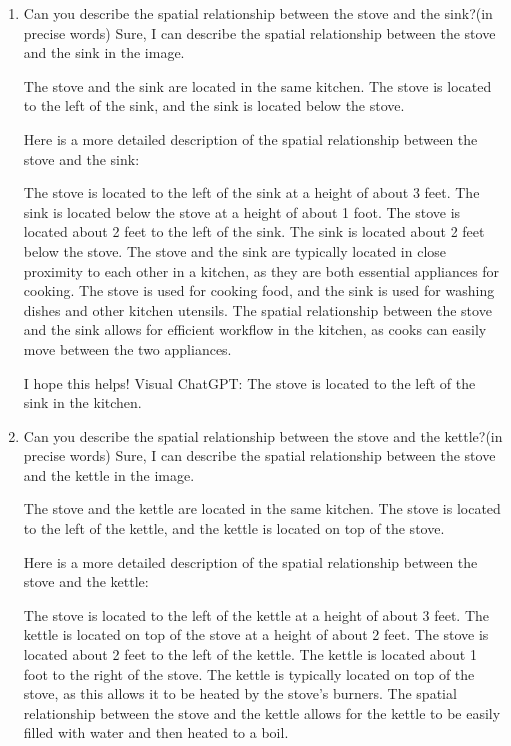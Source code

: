\begin{enumerate}
    \item Can you describe the spatial relationship between the stove and the sink?(in precise words)
    \subitem 
    Sure, I can describe the spatial relationship between the stove and the sink in the image.
    
    The stove and the sink are located in the same kitchen. The stove is located to the left of the sink, and the sink is located below the stove.
    
    Here is a more detailed description of the spatial relationship between the stove and the sink:
    
    The stove is located to the left of the sink at a height of about 3 feet.
    The sink is located below the stove at a height of about 1 foot.
    The stove is located about 2 feet to the left of the sink.
    The sink is located about 2 feet below the stove.
    The stove and the sink are typically located in close proximity to each other in a kitchen, as they are both essential appliances for cooking. The stove is used for cooking food, and the sink is used for washing dishes and other kitchen utensils. The spatial relationship between the stove and the sink allows for efficient workflow in the kitchen, as cooks can easily move between the two appliances.
    
    I hope this helps!
    \subitem Visual ChatGPT: The stove is located to the left of the sink in the kitchen.
    \item Can you describe the spatial relationship between the stove and the kettle?(in precise words)
    \subitem 
    Sure, I can describe the spatial relationship between the stove and the kettle in the image.
    
    The stove and the kettle are located in the same kitchen. The stove is located to the left of the kettle, and the kettle is located on top of the stove.
    
    Here is a more detailed description of the spatial relationship between the stove and the kettle:
    
    The stove is located to the left of the kettle at a height of about 3 feet.
    The kettle is located on top of the stove at a height of about 2 feet.
    The stove is located about 2 feet to the left of the kettle.
    The kettle is located about 1 foot to the right of the stove.
    The kettle is typically located on top of the stove, as this allows it to be heated by the stove's burners. The spatial relationship between the stove and the kettle allows for the kettle to be easily filled with water and then heated to a boil.
    

\end{enumerate}
